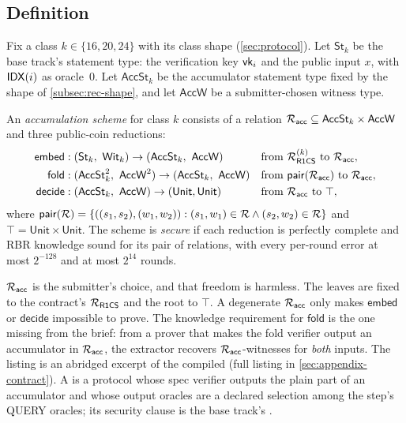 \subsection{Definition}\label{subsec:rec-def}

Fix a class $k\in\{16,20,24\}$ with its class shape (\cref{sec:protocol}). Let $\mathsf{St}_k$ be
the base track's statement type: the verification key $\mathsf{vk}_i$ and the public input $x$, with
$\mathsf{IDX}(i)$ as oracle~0. Let $\mathsf{AccSt}_k$ be the accumulator statement type fixed by the shape
of \cref{subsec:rec-shape}, and let $\mathsf{AccW}$ be a submitter-chosen witness type.

\begin{definition}\label{def:rec-acc}
An \emph{accumulation scheme} for class $k$ consists of a relation
$\mathcal{R}_{\mathsf{acc}}\subseteq\mathsf{AccSt}_k\times\mathsf{AccW}$ and three public-coin reductions:
\begin{align*}
  \mathsf{embed} &: (\mathsf{St}_k,\ \mathsf{Wit}_k)\to(\mathsf{AccSt}_k,\ \mathsf{AccW})
     &&\text{from } \Rrcs^{(k)} \text{ to } \Racc,\\
  \mathsf{fold} &: (\mathsf{AccSt}_k^2,\ \mathsf{AccW}^2)\to(\mathsf{AccSt}_k,\ \mathsf{AccW})
     &&\text{from } \mathsf{pair}(\Racc) \text{ to } \Racc,\\
  \mathsf{decide} &: (\mathsf{AccSt}_k,\ \mathsf{AccW})\to(\mathsf{Unit},\mathsf{Unit})
     &&\text{from } \Racc \text{ to } \top,
\end{align*}
where $\mathsf{pair}(\mathcal{R})=\{((s_1,s_2),(w_1,w_2)) : (s_1,w_1)\in\mathcal{R}\wedge(s_2,w_2)\in\mathcal{R}\}$ and
$\top=\mathsf{Unit}\times\mathsf{Unit}$. The scheme is \emph{secure} if each reduction is perfectly
complete and RBR knowledge sound for its pair of relations, with every per-round error at most
$2^{-128}$ and at most $2^{14}$ rounds.
\end{definition}

$\mathcal{R}_{\mathsf{acc}}$ is the submitter's choice, and that freedom is harmless. The leaves are fixed to the
contract's $\mathcal{R}_{\mathsf{R1CS}}$ and the root to $\top$. A degenerate $\mathcal{R}_{\mathsf{acc}}$ only makes $\mathsf{embed}$ or
$\mathsf{decide}$ impossible to prove. The knowledge requirement for $\mathsf{fold}$ is the one
missing from the brief: from a prover that makes the fold verifier output an accumulator in $\mathcal{R}_{\mathsf{acc}}$,
the extractor recovers $\mathcal{R}_{\mathsf{acc}}$-witnesses for \emph{both} inputs. The listing is an abridged excerpt
of the compiled  (full listing in \cref{sec:appendix-contract}). A
 is a protocol whose spec verifier outputs the plain part of an accumulator and
whose output oracles are a declared selection  among the step's QUERY oracles; its
security clause is the base track's .

